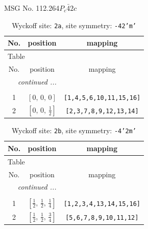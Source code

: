 \documentclass[fleqn,8pt]{jsarticle}
\begin{document}
\setcounter{MaxMatrixCols}{32}

\renewcommand{\tablename}{Table~}
\renewcommand{\figurename}{Figure~}
\begin{center}
\LARGE
MSG No. 112.264\quad$P_{c}\bar{4}2c$
\end{center}
\renewcommand{\arraystretch}{1.2}
\begin{longtable}{ccc}
\caption{Wyckoff site: {\tt 2a}, site symmetry: {\tt -42'm'}}
 \\
 \hline \hline
No. & position & mapping \\ \hline \endfirsthead

\multicolumn{2}{l}{\tablename\ \thetable{}} \\
 \hline \hline
No. & position & mapping \\ \hline \endhead

 \hline \hline
\multicolumn{2}{r}{\footnotesize\it continued ...} \\ \endfoot

 \hline \hline
\multicolumn{2}{r}{} \\ \endlastfoot

1 & $\left[ 0,\, 0,\, 0 \right]$ & {\tt [1,4,5,6,10,11,15,16]} \\ \hline
2 & $\left[ 0,\, 0,\, \frac{1}{2} \right]$ & {\tt [2,3,7,8,9,12,13,14]} \\
\end{longtable}
\renewcommand{\arraystretch}{1.2}
\begin{longtable}{ccc}
\caption{Wyckoff site: {\tt 2b}, site symmetry: {\tt -4'2m'}}
 \\
 \hline \hline
No. & position & mapping \\ \hline \endfirsthead

\multicolumn{2}{l}{\tablename\ \thetable{}} \\
 \hline \hline
No. & position & mapping \\ \hline \endhead

 \hline \hline
\multicolumn{2}{r}{\footnotesize\it continued ...} \\ \endfoot

 \hline \hline
\multicolumn{2}{r}{} \\ \endlastfoot

1 & $\left[ \frac{1}{2},\, \frac{1}{2},\, \frac{1}{4} \right]$ & {\tt [1,2,3,4,13,14,15,16]} \\ \hline
2 & $\left[ \frac{1}{2},\, \frac{1}{2},\, \frac{3}{4} \right]$ & {\tt [5,6,7,8,9,10,11,12]} \\
\end{longtable}
\end{document}
